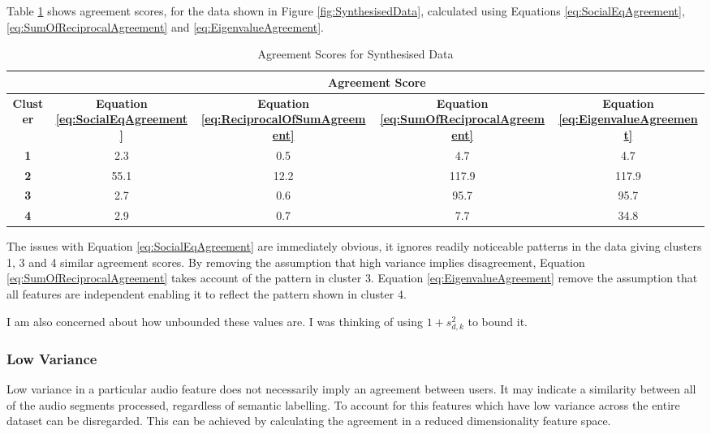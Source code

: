 			Table \ref{tab:SynthesisedDataAgreement} shows agreement scores, for the data shown in Figure
			\ref{fig:SynthesisedData}, calculated using Equations \ref{eq:SocialEqAgreement},
			\ref{eq:SumOfReciprocalAgreement} and \ref{eq:EigenvalueAgreement}.

			\begin{table}[h!]
				\centering
				\begin{tabular}{|c|c|c|c|c|}
					\cline{2-5}
					\multicolumn{1}{c|}{} & \multicolumn{4}{c|}{\bf{Agreement Score}} \tabularnewline
					\hline
					\bf{Cluster} & \bf{Equation \ref{eq:SocialEqAgreement}} & 
					\bf{Equation \ref{eq:ReciprocalOfSumAgreement}} &
					\bf{Equation \ref{eq:SumOfReciprocalAgreement}} & 
					\bf{Equation \ref{eq:EigenvalueAgreement}} \tabularnewline
					\hline
					\hline
					\bf{1} & 2.3 & 0.5 & 4.7 & 4.7 \tabularnewline
					\hline
					\bf{2} & 55.1 & 12.2 & 117.9 & 117.9 \tabularnewline
					\hline
					\bf{3} & 2.7 & 0.6 & 95.7 & 95.7 \tabularnewline
					\hline
					\bf{4} & 2.9 & 0.7 & 7.7 & 34.8 \tabularnewline
					\hline
				\end{tabular}
				\caption{Agreement Scores for Synthesised Data}
				\label{tab:SynthesisedDataAgreement}
			\end{table}

			The issues with Equation \ref{eq:SocialEqAgreement} are immediately obvious, it ignores readily
			noticeable patterns in the data giving clusters 1, 3 and 4 similar agreement scores. By removing
			the assumption that high variance implies disagreement, Equation \ref{eq:SumOfReciprocalAgreement}
			takes account of the pattern in cluster 3. Equation \ref{eq:EigenvalueAgreement} remove the
			assumption that all features are independent enabling it to reflect the pattern shown in cluster 4.

			\note
			{
				I am also concerned about how unbounded these values are. I was thinking of using $1 +
				s_{d,k}^{2}$ to bound it.
			}

		\subsubsection*{Low Variance}
			Low variance in a particular audio feature does not necessarily imply an agreement between users.
			It may indicate a similarity between all of the audio segments processed, regardless of semantic
			labelling. To account for this features which have low variance across the entire dataset can be
			disregarded. This can be achieved by calculating the agreement in a reduced dimensionality feature
			space.

